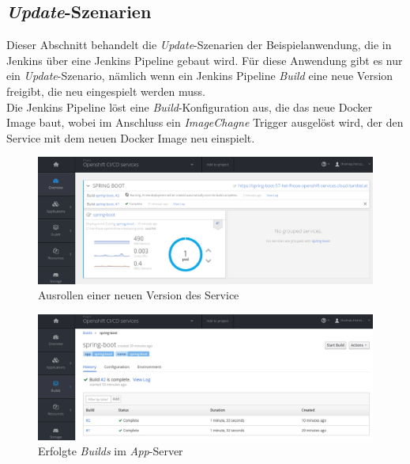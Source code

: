 \subsection{\emph{Update}-Szenarien}
Dieser Abschnitt behandelt die \emph{Update}-Szenarien der Beispielanwendung, die in Jenkins über eine Jenkins Pipeline gebaut wird. Für diese Anwendung gibt es nur ein \emph{Update}-Szenario, nämlich wenn ein Jenkins Pipeline \emph{Build} eine neue Version freigibt, die neu eingespielt werden muss. \\

Die Jenkins Pipeline löst eine \emph{Build}-Konfiguration aus, die das neue Docker Image baut, wobei im Anschluss ein \emph{ImageChagne} Trigger ausgelöst wird, der den Service mit dem neuen Docker Image neu einspielt.
\begin{figure}[H]
	\centering
	\includegraphics[scale=0.55]{image/service-app-redeploy.png}
	\caption{Ausrollen einer neuen Version des Service}
	\label{fig:appserver}
\end{figure}
\begin{figure}[H]
	\centering
	\includegraphics[scale=0.55]{image/service-app-builds.png}
	\caption{Erfolgte \emph{Builds} im \emph{App}-Server}
	\label{fig:appserver}
\end{figure}

